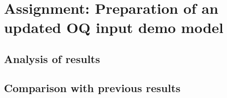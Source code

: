 \documentclass[11pt,a4paper,headings=small,dvips]{scrbook}
\begin{document}
\section{Assignment: Preparation of an updated OQ input demo model}
\subsection{Analysis of results}
\subsection{Comparison with previous results}
\cleardoublepage


\cleardoublepage
\end{document}
